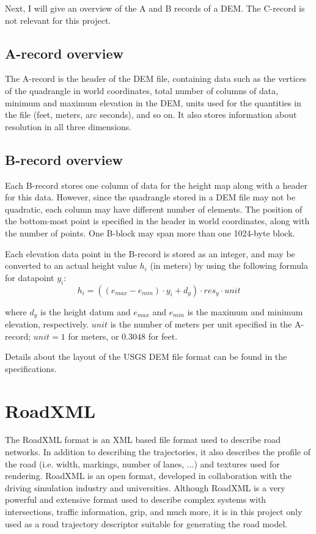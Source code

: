 Next, I will give an overview of the A and B records of a DEM. The C-record is not relevant for this project.

\subsection{A-record overview}
The A-record is the header of the DEM file, containing data such as the vertices of the quadrangle in world coordinates, total number of columns of data, minimum and maximum elevation in the DEM, units used for the quantities in the file (feet, meters, arc seconds), and so on. It also stores information about resolution in all three dimensions. 

\subsection{B-record overview}
\label{sec:back_brecord}
Each B-record stores one column of data for the height map along with a header for this data. However, since the quadrangle stored in a DEM file may not be quadratic, each column may have different number of elements. The position of the bottom-most point is specified in the header in world coordinates, along with the number of points. One B-block may span more than one 1024-byte block.

Each elevation data point in the B-record is stored as an integer, and may be converted to an actual height value $h_i$ (in meters) by using the following formula for datapoint $y_i$:
$$
h_i = ((e_{max}-e_{min})\cdot y_i+ d_y)\cdot res_y \cdot unit
$$

where $d_y$ is the height datum and $e_{max}$ and $e_{min}$ is the maximum and minimum elevation, respectively. $unit$ is the number of meters per unit specified in the A-record; $unit=1$ for meters, or $0.3048$ for feet.

Details about the layout of the USGS DEM file format can be found in the specifications\cite{usgsdem}.

\section{RoadXML}
The RoadXML format is an XML based file format used to describe road networks. In addition to describing the trajectories, it also describes the profile of the road (i.e. width, markings, number of lanes, ...) and textures used for rendering.\cite{roadxml} RoadXML is an open format, developed in collaboration with the driving simulation industry and universities. Although RoadXML is a very powerful and extensive format used to describe complex systems with intersections, traffic information, grip, and much more, it is in this project only used as a road trajectory descriptor suitable for generating the road model.


